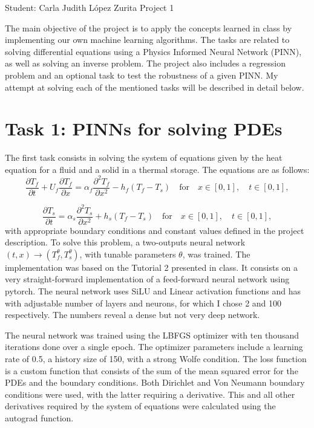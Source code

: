 \documentclass[unicode,11pt,a4paper,oneside,numbers=endperiod,openany]{scrartcl}
\begin{document}
\setassignment
{}

            {Student: Carla Judith L\'opez Zurita}
            {}{Project 1}{}
\newline

The main objective of the project is to apply the concepts learned in class by
implementing our own machine learning algorithms. The tasks
are related to solving differential equations using a Physics Informed Neural
Network (PINN), as well as solving an inverse problem. The project also includes 
a regression problem and an optional task to test the robustness of a given PINN.
My attempt at solving each of the mentioned tasks will be described in detail below.



\section{Task 1:  PINNs for solving PDEs}
The first task consists in solving the system of equations given by the heat
equation for a fluid and a solid in a thermal storage. The equations are as follows:
\begin{equation}
    \frac{\partial T_f}{\partial t} + U_f \frac{\partial T_f}{\partial x} = \alpha_f \frac{\partial^2 T_f}{\partial x^2} - h_f(T_f - T_s) \quad \text{for} \quad x \in [0, 1], \quad t \in [0, 1],
\end{equation}

\begin{equation}
     \frac{\partial T_s}{\partial t} = \alpha_s \frac{\partial^2 T_s}{\partial x^2} + h_s(T_f - T_s) \quad \text{for} \quad x \in [0, 1], \quad t \in [0, 1],
\end{equation}
with appropriate boundary conditions and constant values defined in the project description.
To solve this problem, a two-outputs neural network $(t,x) \to
(T^{\theta}_f,T^{\theta}_s)$, with tunable parameters $\theta$, was trained. The implementation was based on the Tutorial 2 presented in class. It consists on a very
straight-forward implementation of a feed-forward neural network using pytorch.
The neural network uses SiLU and
Linear activation functions and has with adjustable
number of layers and neurons, for which I chose 2 and 100 respectively. The numbers
reveal a dense but not very deep network.

The neural network was trained using the LBFGS optimizer with ten thousand
iterations done over a single epoch. The optimizer parameters include a learning rate 
of 0.5, a history size of 150, with a strong Wolfe condition. The loss
function is a custom function that consists of the sum of the mean squared
error for the PDEs and the boundary conditions. 
Both Dirichlet and Von Neumann boundary conditions were used, with the latter
requiring a derivative. This and all other derivatives required by the system of
equations were calculated using the autograd function.
\end{document}
